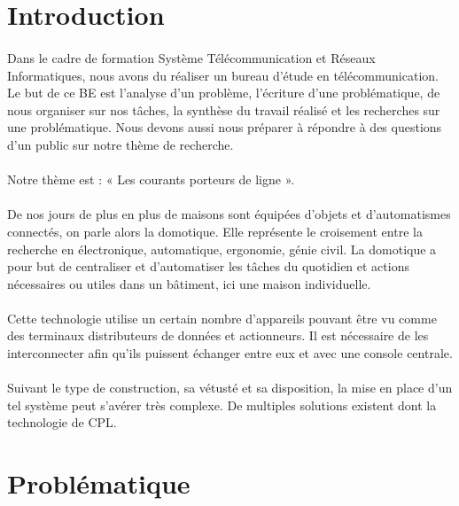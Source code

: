 
\section*{Introduction}
    \paragraph{}
Dans le cadre de formation Système Télécommunication et Réseaux Informatiques, nous avons du réaliser un bureau d'étude en télécommunication.
Le but de ce BE est l'analyse d'un problème, l'écriture d'une problématique, de nous organiser sur nos tâches, la synthèse du travail réalisé et les recherches sur une problématique.
Nous devons aussi nous préparer à répondre à des questions d'un public sur notre thème de recherche.
    \paragraph{}
Notre thème est : « Les courants porteurs de ligne ».
    \paragraph{}
De nos jours de plus en plus de maisons sont équipées d'objets et d'automatismes connectés, on parle alors la domotique.
Elle représente le croisement entre la recherche en électronique, automatique, ergonomie, génie civil.
La domotique a pour but de centraliser et d'automatiser les tâches du quotidien et actions nécessaires ou utiles dans un bâtiment, ici une maison individuelle.
    \paragraph{}
Cette technologie utilise un certain nombre d'appareils pouvant être vu comme des terminaux distributeurs de données et actionneurs.
Il est nécessaire de les interconnecter afin qu'ils puissent échanger entre eux et avec une console centrale.
    \paragraph{}
Suivant le type de construction, sa vétusté et sa disposition, la mise en place d'un tel système peut s'avérer très complexe.
De multiples solutions existent dont la technologie de CPL.



\section*{Problématique}
